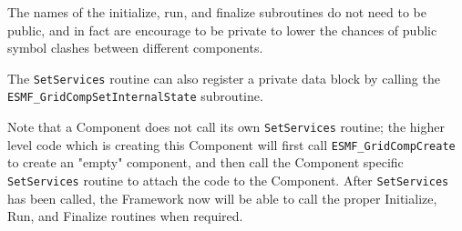 The names of the initialize, run, and finalize subroutines do not
need to be public, and in fact are encourage to be private to lower
the chances of public symbol clashes between different components.

The {\tt SetServices} routine can also register a private data block
by calling the {\tt ESMF\_GridCompSetInternalState} subroutine.

Note that a Component does not call its own {\tt SetServices} routine;
the higher level code which is creating this Component will first call
{\tt ESMF\_GridCompCreate} to create an "empty" component, and then call
the Component specific {\tt SetServices} routine to attach the code
to the Component.  After {\tt SetServices} has been called, the Framework
now will be able to call the proper Initialize, Run, and Finalize routines
when required.  


